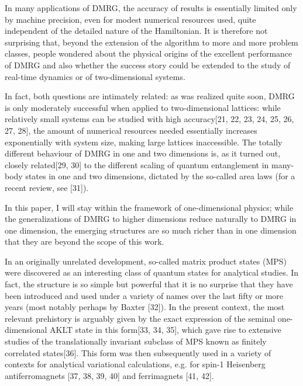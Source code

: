 \documentclass[12pt]{article}
\begin{document}
In many applications of DMRG, the accuracy of results is essentially limited only by machine precision, even for modest numerical resources used, quite independent of the detailed nature of the Hamiltonian. It is therefore not surprising that, beyond the extension of the algorithm to more and more problem classes, people wondered about the physical origins of the excellent performance of DMRG and also whether the success story could be extended to the study of real-time dynamics or of two-dimensional systems.

In fact, both questions are intimately related: as was realized quite soon, DMRG is only moderately successful when applied to two-dimensional lattices: while relatively small systems can be studied with high accuracy[21, 22, 23, 24, 25, 26, 27, 28], the amount of numerical resources needed essentially increases exponentially with system size, making large lattices inaccessible. The totally different behaviour of DMRG in one and two dimensions is, as it turned out, closely related[29, 30] to the different scaling of quantum entanglement in many-body states in one and two dimensions, dictated by the so-called area laws (for a recent review, see [31]).

In this paper, I will stay within the framework of one-dimensional physics; while the generalizations of DMRG to higher dimensions reduce naturally to DMRG in one dimension, the emerging structures are so much richer than in one dimension that they are beyond the scope of this work.

In an originally unrelated development, so-called matrix product states (MPS) were discovered as an interesting class of quantum states for analytical studies. In fact, the structure is so simple but powerful that it is no surprise that they have been introduced and used under a variety of names over the last fifty or more years (most notably perhaps by Baxter [32]). In the present context, the most relevant prehistory is arguably given by the exact expression of the seminal one-dimensional AKLT state in this form[33, 34, 35], which gave rise to extensive studies of the translationally invariant subclass of MPS known as finitely correlated states[36]. This form was then subsequently used in a variety of contexts for analytical variational calculations, e.g. for spin-1 Heisenberg antiferromagnets [37, 38, 39, 40] and ferrimagnets [41, 42].
\end{document}

